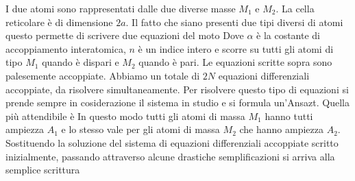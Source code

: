 \begin{center}
\end{center}
I due atomi sono rappresentati dalle due diverse masse $M_1$ e $M_2$. La cella reticolare è di dimensione $2a$. Il fatto che siano presenti due tipi diversi di atomi questo permette di scrivere due equazioni del moto 
Dove $\alpha$ è la costante di accoppiamento interatomica, $n$ è un indice intero e scorre su tutti gli atomi di tipo $M_1$ quando è dispari e $M_2$ quando è pari. Le equazioni scritte sopra sono palesemente accoppiate. Abbiamo un totale di $2N$ equazioni differenziali accoppiate, da risolvere simultaneamente. Per risolvere questo tipo di equazioni si prende sempre in cosiderazione il sistema in studio e si formula un'Ansazt. Quella più attendibile è 
In questo modo tutti gli atomi di massa $M_1$ hanno tutti ampiezza $A_1$ e lo stesso vale per gli atomi di massa $M_2$ che hanno ampiezza $A_2$. Sostituendo la soluzione del sistema di equazioni differenziali accoppiate scritto inizialmente, passando attraverso alcune drastiche semplificazioni si arriva alla semplice scrittura
